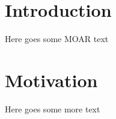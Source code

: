 \documentclass[../Thesis_AHoecherl.tex]{subfiles}
\begin{document}
    \section{Introduction}
    Here goes some MOAR text
    \section{Motivation}
    Here goes some more text
\end{document}
